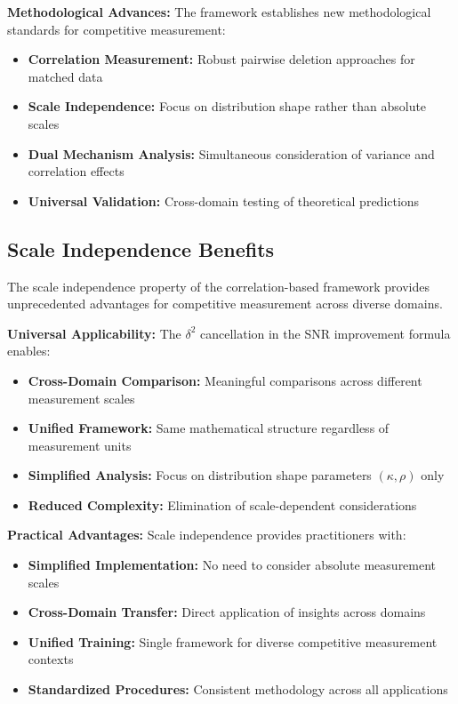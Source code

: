 \textbf{Methodological Advances:}
The framework establishes new methodological standards for competitive measurement:
\begin{itemize}
    \item \textbf{Correlation Measurement:} Robust pairwise deletion approaches for matched data
    \item \textbf{Scale Independence:} Focus on distribution shape rather than absolute scales
    \item \textbf{Dual Mechanism Analysis:} Simultaneous consideration of variance and correlation effects
    \item \textbf{Universal Validation:} Cross-domain testing of theoretical predictions
\end{itemize}

\subsection{Scale Independence Benefits}

The scale independence property of the correlation-based framework provides unprecedented advantages for competitive measurement across diverse domains.

\textbf{Universal Applicability:}
The $\delta^2$ cancellation in the SNR improvement formula enables:
\begin{itemize}
    \item \textbf{Cross-Domain Comparison:} Meaningful comparisons across different measurement scales
    \item \textbf{Unified Framework:} Same mathematical structure regardless of measurement units
    \item \textbf{Simplified Analysis:} Focus on distribution shape parameters $(\kappa, \rho)$ only
    \item \textbf{Reduced Complexity:} Elimination of scale-dependent considerations
\end{itemize}

\textbf{Practical Advantages:}
Scale independence provides practitioners with:
\begin{itemize}
    \item \textbf{Simplified Implementation:} No need to consider absolute measurement scales
    \item \textbf{Cross-Domain Transfer:} Direct application of insights across domains
    \item \textbf{Unified Training:} Single framework for diverse competitive measurement contexts
    \item \textbf{Standardized Procedures:} Consistent methodology across all applications
\end{itemize}

